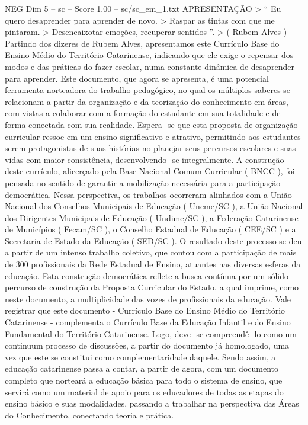 \begin{textsample}{NEG Dim 5 – sc – Score 1.00 – sc/sc\_em\_1.txt}  \label{ex:f5_neg_259}
APRESENTAÇÃO > “ Eu quero desaprender para aprender de novo. > Raspar as tintas com que me pintaram. > Desencaixotar emoções, recuperar sentidos ”. > ( Rubem Alves ) Partindo dos dizeres de Rubem Alves, apresentamos este Currículo Base do Ensino Médio do Território Catarinense, indicando que ele exige o repensar dos modos e das práticas do fazer escolar, numa constante dinâmica de desaprender para aprender.
Este documento, que agora se apresenta, é uma potencial ferramenta norteadora do trabalho pedagógico, no qual os múltiplos saberes se relacionam a partir da organização e da teorização do conhecimento em áreas, com vistas a colaborar com a formação do estudante em sua totalidade e de forma conectada com sua realidade.
Espera -se que esta proposta de organização curricular ressoe em um ensino significativo e atrativo, permitindo aos estudantes serem protagonistas de suas histórias no planejar seus percursos escolares e suas vidas com maior consistência, desenvolvendo -se integralmente.
A construção deste currículo, alicerçado pela Base Nacional Comum Curricular ( BNCC ), foi pensada no sentido de garantir a mobilização necessária para a participação democrática.
Nessa perspectiva, os trabalhos ocorreram alinhados com a União Nacional dos Conselhos Municipais de Educação ( Uncme/SC ), a União Nacional dos Dirigentes Municipais de Educação ( Undime/SC ), a Federação Catarinense de Municípios ( Fecam/SC ), o Conselho Estadual de Educação ( CEE/SC ) e a Secretaria de Estado da Educação ( SED/SC ).
O resultado deste processo se deu a partir de um intenso trabalho coletivo, que contou com a participação de mais de 300 profissionais da Rede Estadual de Ensino, atuantes nas diversas esferas da educação.
Esta construção democrática reflete a busca contínua por um sólido percurso de construção da Proposta Curricular do Estado, a qual imprime, como neste documento, a multiplicidade das vozes de profissionais da educação.
Vale registrar que este documento - Currículo Base do Ensino Médio do Território Catarinense - complementa o Currículo Base da Educação Infantil e do Ensino Fundamental do Território Catarinense.
Logo, deve -se compreendê -lo como um continuum processo de discussões, a partir do documento já homologado, uma vez que este se constitui como complementaridade daquele.
Sendo assim, a educação catarinense passa a contar, a partir de agora, com um documento completo que norteará a educação básica para todo o sistema de ensino, que servirá como um material de apoio para os educadores de todas as etapas do ensino básico e suas modalidades, passando a trabalhar na perspectiva das Áreas do Conhecimento, conectando teoria e prática.

\end{textsample}
